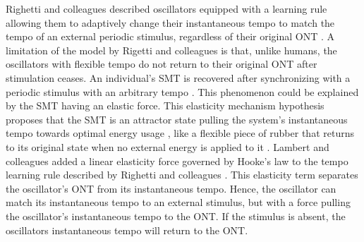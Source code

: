\documentclass{report}
\begin{document}
Righetti and colleagues described oscillators equipped with a learning rule allowing them to adaptively change their instantaneous tempo to match the tempo of an external periodic stimulus, regardless of their original ONT \cite{righetti2006dynamic}. A limitation of the model by Rigetti and colleagues is that, unlike humans, the oscillators with flexible tempo do not return to their original ONT after stimulation ceases. An individual’s SMT is recovered after synchronizing with a periodic stimulus with an arbitrary tempo \cite{scheurich2018tapping}. This phenomenon could be explained by the SMT having an elastic force. This elasticity mechanism hypothesis proposes that the SMT is an attractor state pulling the system’s instantaneous tempo towards optimal energy usage \cite{mcauley2006time, scheurich2018tapping}, like a flexible piece of rubber that returns to its original state when no external energy is applied to it \cite{strogatz1993coupled}. Lambert and colleagues added a linear elasticity force governed by Hooke’s law to the tempo learning rule described by Righetti and colleagues \cite{lambert2016adaptive}. This elasticity term separates the oscillator's ONT from its instantaneous tempo. Hence, the oscillator can match its instantaneous tempo to an external stimulus, but with a force pulling the oscillator's instantaneous tempo to the ONT. If the stimulus is absent, the oscillators instantaneous tempo will return to the ONT.
\end{document}
